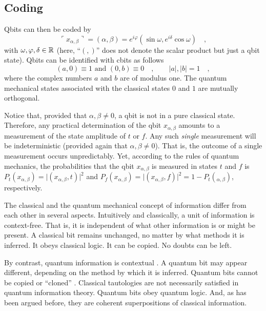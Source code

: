 \subsection{Coding}
 Qbits can then be coded by
\begin{equation}
\ulcorner
x_{\alpha ,\beta }\urcorner  =(\alpha ,\beta )=
e^{i\varphi } (\sin \omega  ,e^{i\delta } \cos \omega )\quad ,
\end{equation}
with
$\omega ,\varphi ,\delta \in {\Bbb R}$
(here, ``$(,)$'' does not denote the scalar product but just a qbit
state). Qbits can be identified with cbits as follows
\begin{equation}
(a,0)\equiv 1
\mbox{ and }
(0,b)\equiv 0
\quad , \qquad
\vert a\vert,
\vert b\vert =1\quad ,
\end{equation}
where the complex numbers $a$ and $b$ are of modulus one.
The quantum mechanical  states associated with the classical states $0$
and $1$ are mutually orthogonal.


Notice that, provided that $\alpha,\beta \neq 0$, a
qbit is not in a pure classical state. Therefore,
any practical determination of the qbit $x_{\alpha ,\beta }$
amounts to a measurement of the state amplitude of $t$ or $f$.
 Any such {\em single} measurement will be
indeterministic (provided again that $\alpha,\beta \neq 0$). That is,
the outcome of a single measurement occurs unpredictably.
Yet, according to the rules of quantum mechanics, the probabilities
that the qbit $x_{\alpha ,\beta }$ is measured in states $t$
and
$f$ is
$P_t(x_{\alpha ,\beta })=
\vert (x_{\alpha ,\beta },t)\vert^2
$ and
$P_f(x_{\alpha ,\beta })=
\vert (x_{\alpha ,\beta },f)\vert^2
=1-P_t(_{\alpha ,\beta })
$, respectively.

The classical and the quantum mechanical
concept of information differ from each other in several aspects.
Intuitively and classically, a unit of information is context-free.
That is, it is independent of what other information is or
might be present. A classical bit remains unchanged, no matter by what
methods it is inferred.
It obeys classical logic.
It can be copied. No doubts can be left.

By contrast,
quantum information is contextual \cite{kochen-specker:65a,kochen1}.
A quantum bit may appear different,
depending on the method by which it is inferred.
Quantum bits cannot be copied or ``cloned''
\cite{wo-zu,dieks,mandel:83,mil-hard,glauber,caves}.
Classical tautologies are not necessarily satisfied in quantum
information theory. Quantum bits obey quantum logic.
And, as has been argued before, they are coherent superpositions of
classical information.

